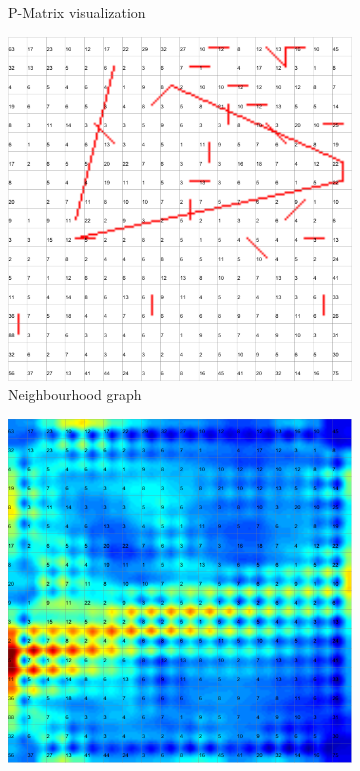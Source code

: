 \documentclass{acm_proc_article-sp}
\begin{document}
\begin{figure}
\begin{subfigure}[b]{0.45\linewidth}
    \caption{P-Matrix visualization}
    \label{fig:wine-mid-p-matrix}
\end{subfigure}
\begin{subfigure}[b]{0.45\linewidth}
    \includegraphics[width=\linewidth]{img/wine-mid-radius-neighbourhood-graph}
    \caption{Neighbourhood graph}
    \label{fig:wine-mid-radius-neighbourhood-graph}
\end{subfigure}
\begin{subfigure}[b]{0.45\linewidth}
    \includegraphics[width=\linewidth]{img/wine-mid-u-matrix}

\end{subfigure}
\end{figure}
\end{document}
